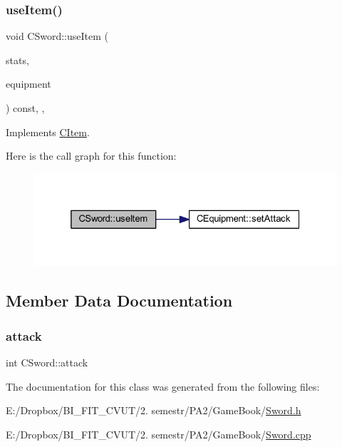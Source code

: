 \subsubsection{\texorpdfstring{use\+Item()}{useItem()}}
{\footnotesize\ttfamily void C\+Sword\+::use\+Item (\begin{DoxyParamCaption}\item[{\mbox{\hyperlink{struct_hero_stats}{Hero\+Stats}} \&}]{stats,  }\item[{\mbox{\hyperlink{class_c_equipment}{C\+Equipment}} \&}]{equipment }\end{DoxyParamCaption}) const\hspace{0.3cm}{\ttfamily [inline]}, {\ttfamily [override]}, {\ttfamily [virtual]}}



Implements \mbox{\hyperlink{class_c_item_a30e8dd9608c78cd43e5c973bfe029baa}{C\+Item}}.

Here is the call graph for this function\+:\nopagebreak
\begin{figure}[H]
\begin{center}
\leavevmode
\includegraphics[width=325pt]{class_c_sword_a565b01124ed0c92e6873dcc0263d4a79_cgraph}
\end{center}
\end{figure}


\subsection{Member Data Documentation}
\mbox{\label{class_c_sword_aba621bda5f596d0d586f2cb4b5849dee}} 
\subsubsection{\texorpdfstring{attack}{attack}}
{\footnotesize\ttfamily int C\+Sword\+::attack\hspace{0.3cm}{\ttfamily [protected]}}



The documentation for this class was generated from the following files\+:\begin{DoxyCompactItemize}
\item 
E\+:/\+Dropbox/\+B\+I\+\_\+\+F\+I\+T\+\_\+\+C\+V\+U\+T/2. semestr/\+P\+A2/\+Game\+Book/\mbox{\hyperlink{_sword_8h}{Sword.\+h}}\item 
E\+:/\+Dropbox/\+B\+I\+\_\+\+F\+I\+T\+\_\+\+C\+V\+U\+T/2. semestr/\+P\+A2/\+Game\+Book/\mbox{\hyperlink{_sword_8cpp}{Sword.\+cpp}}\end{DoxyCompactItemize}
